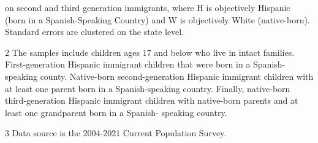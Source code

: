 \begin{table}[!h]
{\begin{threeparttable}
\begin{tablenotes}
{                      on second and third generation immigrants, where H is objectively Hispanic (born in a Spanish-Speaking Country) and W is objectively White (native-born). 
                      Standard errors are clustered on the state level.}
\item[2] \footnotesize{The samples include children ages 17 and below who live in intact families. 
                      First-generation Hispanic immigrant children that were born in a 
                      Spanish-speaking county. Native-born second-generation Hispanic 
                      immigrant children with at least one parent born in a Spanish-speaking 
                      country. Finally, native-born third-generation Hispanic immigrant children 
                      with native-born parents and at least one grandparent born in a Spanish-
                      speaking country.}
\item[3] \footnotesize{Data source is the 2004-2021 Current Population Survey.}
\end{tablenotes}
\end{threeparttable}}
\end{table}

